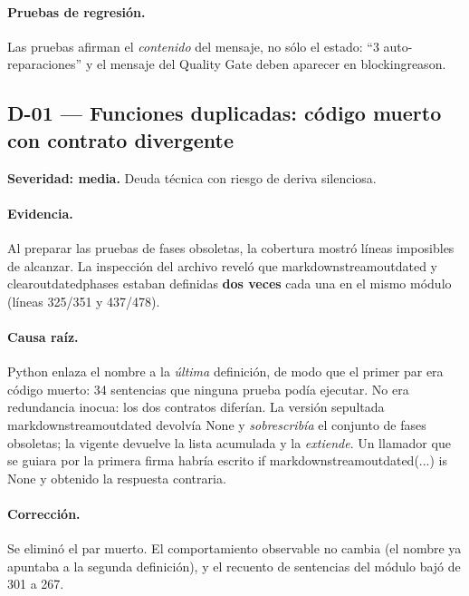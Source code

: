 \documentclass[11pt,a4paper]{article}
\newcommand{\code}[1]{{\ttfamily\small\def\_{\textunderscore\allowbreak}#1}}
\begin{document}
\paragraph{Pruebas de regresión.} Las pruebas afirman el \emph{contenido} del mensaje, no
sólo el estado: \code{``3 auto-reparaciones''} y el mensaje del Quality Gate deben aparecer
en \code{blocking\_reason}.

\subsection*{D-01 --- Funciones duplicadas: código muerto con contrato divergente}

\begin{finding}
\textbf{Severidad: media.} Deuda técnica con riesgo de deriva silenciosa.
\end{finding}

\paragraph{Evidencia.} Al preparar las pruebas de fases obsoletas, la cobertura mostró
líneas imposibles de alcanzar. La inspección del archivo reveló que
\code{mark\_downstream\_outdated} y \code{clear\_outdated\_phases} estaban definidas
\textbf{dos veces} cada una en el mismo módulo (líneas 325/351 y 437/478).

\paragraph{Causa raíz.} Python enlaza el nombre a la \emph{última} definición, de modo que el
primer par era código muerto: 34 sentencias que ninguna prueba podía ejecutar. No era
redundancia inocua: los dos contratos diferían. La versión sepultada
\code{mark\_downstream\_outdated} devolvía \code{None} y \emph{sobrescribía} el conjunto de
fases obsoletas; la vigente devuelve la lista acumulada y la \emph{extiende}. Un llamador
que se guiara por la primera firma habría escrito
\code{if mark\_downstream\_outdated(...) is None} y obtenido la respuesta contraria.

\paragraph{Corrección.} Se eliminó el par muerto. El comportamiento observable no cambia
(el nombre ya apuntaba a la segunda definición), y el recuento de sentencias del módulo bajó
de 301 a 267.
\end{document}
